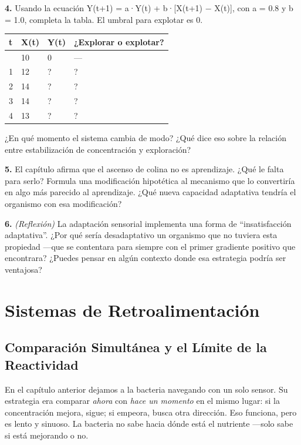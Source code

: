 \documentclass[
  letterpaper,
  DIV=11,
  numbers=noendperiod]{scrreprt}
\begin{document}
\textbf{4.} Usando la ecuación Y(t+1) = a·Y(t) + b·{[}X(t+1) − X(t){]},
con a = 0.8 y b = 1.0, completa la tabla. El umbral para explotar es 0.

\begin{longtable}[]{@{}llll@{}}
\toprule\noalign{}
t & X(t) & Y(t) & ¿Explorar o explotar? \\
\midrule\noalign{}
\endhead
\bottomrule\noalign{}
\endlastfoot
0 & 10 & 0 & --- \\
1 & 12 & ? & ? \\
2 & 14 & ? & ? \\
3 & 14 & ? & ? \\
4 & 13 & ? & ? \\
\end{longtable}

¿En qué momento el sistema cambia de modo? ¿Qué dice eso sobre la
relación entre estabilización de concentración y exploración?

\textbf{5.} El capítulo afirma que el ascenso de colina no es
aprendizaje. ¿Qué le falta para serlo? Formula una modificación
hipotética al mecanismo que lo convertiría en algo más parecido al
aprendizaje. ¿Qué nueva capacidad adaptativa tendría el organismo con
esa modificación?

\textbf{6.} \emph{(Reflexión)} La adaptación sensorial implementa una
forma de ``insatisfacción adaptativa''. ¿Por qué sería desadaptativo un
organismo que no tuviera esta propiedad ---que se contentara para
siempre con el primer gradiente positivo que encontrara? ¿Puedes pensar
en algún contexto donde esa estrategia podría ser ventajosa?


\chapter{Sistemas de
Retroalimentación}\label{sistemas-de-retroalimentaciuxf3n}

\section{Comparación Simultánea y el Límite de la
Reactividad}\label{comparaciuxf3n-simultuxe1nea-y-el-luxedmite-de-la-reactividad}

En el capítulo anterior dejamos a la bacteria navegando con un solo
sensor. Su estrategia era comparar \emph{ahora} con \emph{hace un
momento} en el mismo lugar: si la concentración mejora, sigue; si
empeora, busca otra dirección. Eso funciona, pero es lento y sinuoso. La
bacteria no sabe hacia dónde está el nutriente ---solo sabe si está
mejorando o no.
\end{document}
